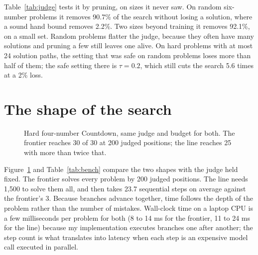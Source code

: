 \documentclass[10pt,twocolumn]{article}
\newcommand{\IS}{Interference Search}
\begin{document}
Table~\ref{tab:judge} tests it by pruning, on sizes it never saw. On random six-number problems it removes 90.7\% of the search without losing a solution, where a sound hand bound removes 2.2\%. Two sizes beyond training it removes 92.1\%, on a small set. Random problems flatter the judge, because they often have many solutions and pruning a few still leaves one alive. On hard problems with at most 24 solution paths, the setting that was safe on random problems loses more than half of them; the safe setting there is $\tau=0.2$, which still cuts the search 5.6 times at a 2\% loss.

\section{The shape of the search}
\label{sec:shape}

\begin{figure}[t]
\centering
{}
\caption{Hard four-number Countdown, same judge and budget for both. The frontier reaches 30 of 30 at 200 judged positions; the line reaches 25 with more than twice that.}
\label{fig:curves}
\end{figure}

Figure~\ref{fig:curves} and Table~\ref{tab:bench} compare the two shapes with the judge held fixed. The frontier solves every problem by 200 judged positions. The line needs 1,500 to solve them all, and then takes 23.7 sequential steps on average against the frontier's 3. Because branches advance together, time follows the depth of the problem rather than the number of mistakes. Wall-clock time on a laptop CPU is a few milliseconds per problem for both (8 to 14 ms for the frontier, 11 to 24 ms for the line) because my implementation executes branches one after another; the step count is what translates into latency when each step is an expensive model call executed in parallel.
\end{document}
